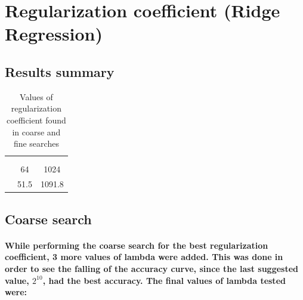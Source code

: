 \documentclass[a4paper]{article}    %
\begin{document}
\section{Regularization coefficient (Ridge Regression)}

\subsection{Results summary}

\begin{table}[H]
    \begin{center}
        \begin{tabular}{r|c|c|} 
            \cline{2-3}
            & \multicolumn{2}{|c|}{\cellcolor[gray]{0.8}{$\lambda$ optimum}} \\
            \cline{2-3}
            & \cellcolor[gray]{0.8}{MSE} & \cellcolor[gray]{0.8}{Accuracy} \\
            \cline{1-3}
            \multicolumn{1}{|r|}{\cellcolor[gray]{0.8}{coarse search}} & 64   & 1024   \\
            \cline{1-3}
            \multicolumn{1}{|r|}{\cellcolor[gray]{0.8}{fine search}}   & 51.5 & 1091.8 \\
            \cline{1-3}
        \end{tabular}
    \end{center}
    \caption{Values of regularization coefficient found in coarse and fine searches}
    \label{tab:alpha_results}
\end{table}

\subsection{Coarse search}

\paragraph{While performing the coarse search for the best regularization coefficient, 3 more values of lambda were added. This was done in order to see the falling of the accuracy curve, since the last suggested value, $2^{10}$, had the best accuracy. The final values of lambda tested were:}
\end{document}

